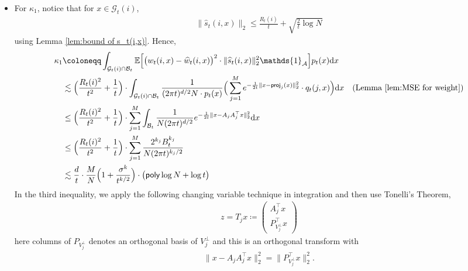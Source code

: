 \documentclass{article}
\newcommand{\ind}{\mathds{1}}
\newcommand{\defn}{\coloneqq}
\newcommand{\diff}{\,\mathrm{d}}
\newcommand{\polylog}{\mathsf{poly}\log}
\newcommand{\proj}{\mathsf{proj}}
\theoremstyle{plain}
\theoremstyle{remark}
\begin{document}
\begin{itemize}
    \item For $\kappa_1$, notice that for $x\in \mathcal{G}_t(i)$, 
    \begin{align*}
        \| \widehat{s}_t(i,x)\| _2 \leq \frac{R_t(i)}{t} + \sqrt{\frac{2}{t}\log N} 
    \end{align*}
    using Lemma \ref{lem:bound of s_t(i,x)}. Hence, 
    \begin{align*}
        \kappa_1 &\defn \int_{\mathcal{G}_{t}(i) \cap \mathcal{B}_t} \mathbb{E} \Big[  \big(w_t(i,x)-\widehat{w}_t(i,x)\big)^2 \cdot \|\widehat{s}_t(i,x) \|_2^2 \ind_{\mathcal{A}}\Big] p_t(x) \!\diff x \\
        & \lesssim \Big( \frac{R_t(i)^2}{t^2} + \frac{1}{t}\Big) \cdot \int_{\mathcal{G}_t(i) \cap \mathcal{B}_t}  \frac{1}{(2\pi t)^{d/2}N\cdot p_t(x)} \Big(\sum_{j=1}^M e^{-\frac{1}{2t}\|x-\proj_j(x)\|_2^2} \cdot q_t(j,x) \Big) \!\diff x \quad (\text{Lemma \ref{lem:MSE for weight}}) \\
        &\leq \Big( \frac{R_t(i)^2}{t^2} + \frac{1}{t}\Big) \cdot \sum_{j=1}^M \int_{\mathcal{B}_t} \frac{1}{N(2\pi t)^{d/2}} e^{-\frac{1}{2t} \| x-A_jA_j^{\top}x\|_2^2}  \!\diff x \\
        & \leq \Big( \frac{R_t(i)^2}{t^2} + \frac{1}{t}\Big) \cdot  \sum_{j=1}^M \frac{2^{k_j} B_t^{k_j}}{N(2\pi t)^{k_j/2}} \\
        &\lesssim \frac{d}{t}\cdot \frac{M}{N}\Big( 1+\frac{\sigma^k}{t^{k/2}}\Big) \cdot \big(\polylog N +\log t\big)
    \end{align*}
    In the third inequality, we apply the following changing variable technique in integration and then use Tonelli's Theorem, 
    \begin{align}
            z = T_jx \defn 
            \begin{pmatrix}
             A_j^{\top}x\\
            P_{V_j^{\perp}}^{\top} x
        \end{pmatrix} \label{eq:changing var}
        \end{align}
        here columns of $P_{V_j^{\perp}}$ denotes an orthogonal basis of $V_j^{\perp}$ and this is an orthogonal transform with
    \begin{align*}
        \|x-A_jA_j^{\top}x\|_2^2 = \|P_{V_j^{\perp}}^{\top} x\|_2^2. 
    \end{align*}


\end{itemize}
\end{document}
